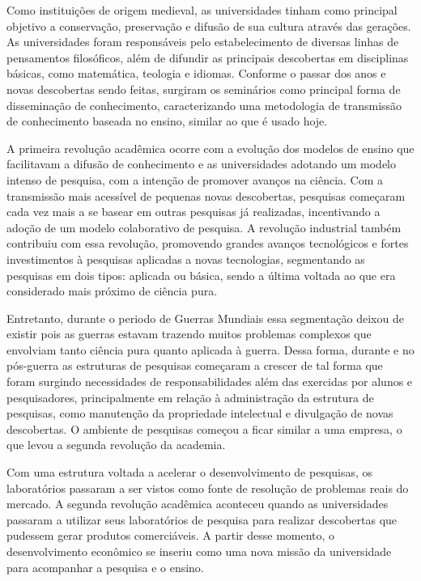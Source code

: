Como instituições de origem medieval, as universidades tinham como principal objetivo a conservação, preservação e difusão de sua cultura através das gerações. As universidades foram responsáveis pelo estabelecimento de diversas linhas de pensamentos filosóficos, além de difundir as principais descobertas em disciplinas básicas, como matemática, teologia e idiomas. Conforme o passar dos anos e novas descobertas sendo feitas, surgiram os seminários como principal forma de disseminação de conhecimento, caracterizando uma metodologia de transmissão de conhecimento baseada no ensino, similar ao que é usado hoje. 

A primeira revolução acadêmica ocorre com a evolução dos modelos de ensino que facilitavam a difusão de conhecimento e as universidades adotando um modelo intenso de pesquisa, com a intenção de promover avanços na ciência. Com a transmissão mais acessível de pequenas novas descobertas, pesquisas começaram cada vez mais a se basear em outras pesquisas já realizadas, incentivando a adoção de um modelo colaborativo de pesquisa. A revolução industrial também contribuiu com essa revolução, promovendo grandes avanços tecnológicos e fortes investimentos à pesquisas aplicadas a novas tecnologias, segmentando as pesquisas em dois tipos: aplicada ou básica, sendo a última voltada ao que era considerado mais próximo de ciência pura.

Entretanto, durante o periodo de Guerras Mundiais essa segmentação deixou de existir pois as guerras estavam trazendo muitos problemas complexos que envolviam tanto ciência pura quanto aplicada à guerra. Dessa forma, durante e no pós-guerra as estruturas de pesquisas começaram a crescer de tal forma que foram surgindo necessidades de responsabilidades além das exercidas por alunos e pesquisadores, principalmente em relação à administração da estrutura de pesquisas, como manutenção da propriedade intelectual e divulgação de novas descobertas. O ambiente de pesquisas começou a ficar similar a uma empresa, o que levou a segunda revolução da academia.

Com uma estrutura voltada a acelerar o desenvolvimento de pesquisas, os laboratórios passaram a ser vistos como fonte de resolução de problemas reais do mercado. A segunda revolução acadêmica aconteceu quando as universidades passaram a utilizar seus laboratórios de pesquisa para realizar descobertas que pudessem gerar produtos comerciáveis. A partir desse momento, o desenvolvimento econômico se inseriu como uma nova missão da universidade para acompanhar a pesquisa e o ensino.

